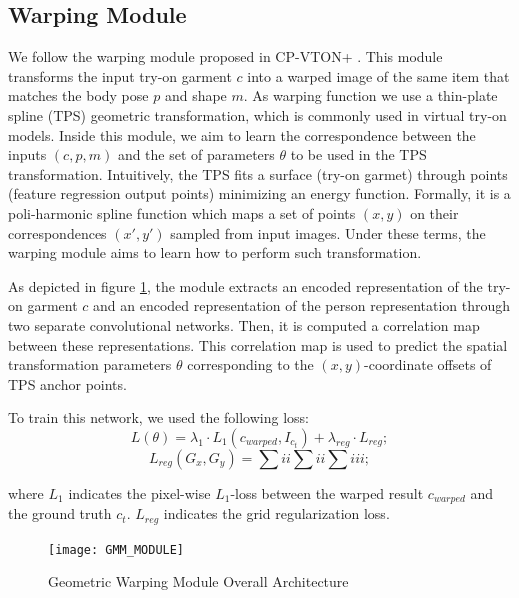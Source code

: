 \subsection{Warping Module}
We follow the warping module proposed in CP-VTON+ \cite{CP-VTON+}.
This module transforms the input try-on garment $c$ into a warped image of the same item that matches the body pose $p$ and shape $m$. As warping function we use a thin-plate spline (TPS) geometric transformation, which is commonly used in virtual try-on models.  Inside this module, we aim to learn the correspondence between the inputs $(c, p, m)$ and the set of parameters $\theta$ to be used in the TPS transformation. Intuitively, the TPS fits a surface (try-on garmet) through points (feature regression output points) minimizing an energy function. Formally, it is a poli-harmonic spline function which maps a set of points $(x,y)$ on their correspondences $(x',y')$ sampled from input images. Under these terms, the warping module aims to learn how to perform such transformation.

As depicted in figure \ref{fig:GMM_MODULE}, the module extracts an encoded representation of the try-on garment $c$ and an encoded representation of the person representation through two separate convolutional networks.
Then, it is computed a correlation map between these representations.
This correlation map is used to predict the spatial transformation parameters $\theta$ corresponding to the $(x,y)$-coordinate offsets of TPS anchor points. 

To train this network, we used the following loss:
\begin{equation}
L(\theta) = \lambda_1 \cdot L_1(c_{warped}, I_{c_t}) + \lambda_{reg} \cdot L_{reg} ;
\end{equation} 
\begin{equation}
L_{reg}(G_x, G_y) = \sum{i}{i}\sum{i}{i}\sum{i}{i}i ;
\end{equation}

where $L_1$ indicates the pixel-wise $L_1$-loss between the warped result $c_{warped}$ and the ground truth $c_t$. $L_{reg}$ indicates the grid regularization loss.

\begin{figure}[h]
\centering
\texttt{[image: GMM\_MODULE]}
\caption{Geometric Warping Module Overall Architecture}
\label{fig:GMM_MODULE}
\end{figure}



